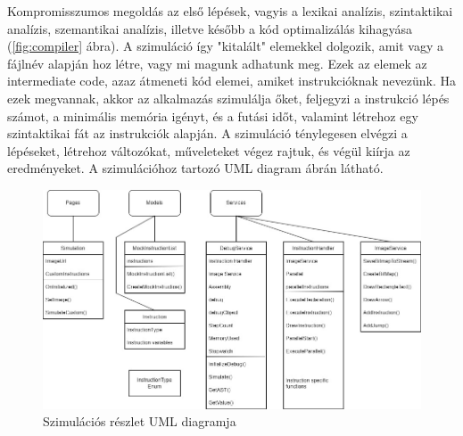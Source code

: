 Kompromisszumos megoldás az első lépések, vagyis a lexikai analízis, szintaktikai analízis, szemantikai analízis, illetve később a kód optimalizálás kihagyása (\ref{fig:compiler} ábra). A szimuláció így "kitalált" elemekkel dolgozik, amit vagy a fájlnév alapján hoz létre, vagy mi magunk adhatunk meg. Ezek az elemek az intermediate code, azaz átmeneti kód elemei, amiket instrukcióknak nevezünk. Ha ezek megvannak, akkor az alkalmazás szimulálja őket, feljegyzi a instrukció lépés számot, a minimális memória igényt, és a futási időt, valamint létrehoz egy szintaktikai fát az instrukciók alapján. A szimuláció ténylegesen elvégzi a lépéseket, létrehoz változókat, műveleteket végez rajtuk, és végül kiírja az eredményeket. A szimulációhoz tartozó UML diagram  ábrán látható.

\begin{figure}[h]
\centering
\includegraphics[width=\textwidth]{images/SimUML.jpg}
\caption{Szimulációs részlet UML diagramja}
\label{fig:simUML}
\end{figure}









